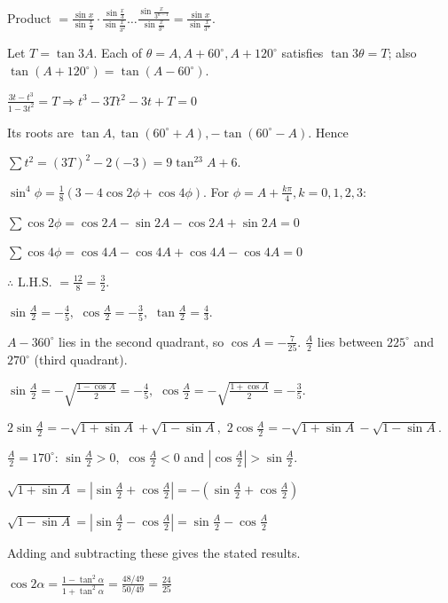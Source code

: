   Product $= \frac{\sin x}{\sin\frac{x}{3}}\cdot\frac{\sin\frac{x}{3}}{\sin\frac{x}{3^2}}\ldots\frac{\sin\frac{x}{3^{n -
  1}}}{\sin\frac{x}{3^n}} = \frac{\sin x}{\sin\frac{x}{3^n}}$.

\item Let $T = \tan3A$. Each of $\theta = A, A + 60^\circ, A + 120^\circ$ satisfies $\tan3\theta = T$; also $\tan(A +
  120^\circ) = \tan(A - 60^\circ)$.

  $\frac{3t - t^3}{1 - 3t^2} = T \Rightarrow t^3 - 3Tt^2 - 3t + T = 0$

  Its roots are $\tan A, \tan(60^\circ + A), -\tan(60^\circ - A)$. Hence

  $\sum t^2 = (3T)^2 - 2(-3) = 9\tan^23A + 6$.

\item $\sin^4\phi = \frac{1}{8}(3 - 4\cos2\phi + \cos4\phi)$. For $\phi = A + \frac{k\pi}{4}, k = 0, 1, 2, 3$:

  $\sum\cos2\phi = \cos2A - \sin2A - \cos2A + \sin2A = 0$

  $\sum\cos4\phi = \cos4A - \cos4A + \cos4A - \cos4A = 0$

  $\therefore$ L.H.S. $= \frac{12}{8} = \frac{3}{2}$.

\item $\sin\frac{A}{2} = -\frac{4}{5},$ $\cos\frac{A}{2} = -\frac{3}{5},$ $\tan\frac{A}{2} = \frac{4}{3}$.

  $A - 360^\circ$ lies in the second quadrant, so $\cos A = -\frac{7}{25}$. $\frac{A}{2}$ lies between $225^\circ$ and
  $270^\circ$ (third quadrant).

  $\sin\frac{A}{2} = -\sqrt{\frac{1 - \cos A}{2}} = -\frac{4}{5},$ $\cos\frac{A}{2} = -\sqrt{\frac{1 + \cos A}{2}} = -\frac{3}{5}$.

\item $2\sin\frac{A}{2} = -\sqrt{1 + \sin A} + \sqrt{1 - \sin A},$ $2\cos\frac{A}{2} = -\sqrt{1 + \sin A} - \sqrt{1 - \sin A}$.

  $\frac{A}{2} = 170^\circ$: $\sin\frac{A}{2} > 0,$ $\cos\frac{A}{2} < 0$ and $|\cos\frac{A}{2}| > \sin\frac{A}{2}$.

  $\sqrt{1 + \sin A} = \left|\sin\frac{A}{2} + \cos\frac{A}{2}\right| = -\left(\sin\frac{A}{2} + \cos\frac{A}{2}\right)$

  $\sqrt{1 - \sin A} = \left|\sin\frac{A}{2} - \cos\frac{A}{2}\right| = \sin\frac{A}{2} - \cos\frac{A}{2}$

  Adding and subtracting these gives the stated results.

\item $\cos2\alpha = \frac{1 - \tan^2\alpha}{1 + \tan^2\alpha} = \frac{48/49}{50/49} = \frac{24}{25}$

